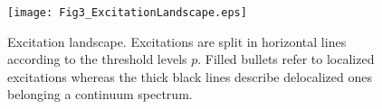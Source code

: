 \documentclass[reprint,aps,prb]{revtex4-1}
\newcommand{\eps}{\epsilon}
\begin{document}

\begin{figure}[!t]
\texttt{[image: Fig3\_ExcitationLandscape.eps]}
\caption{\label{ExcitationLandscape} Excitation landscape. Excitations are split in horizontal lines according to the threshold
levels $p$. Filled bullets refer to localized excitations whereas the thick black lines describe delocalized ones belonging a
continuum spectrum.}
\end{figure}
\end{document}
